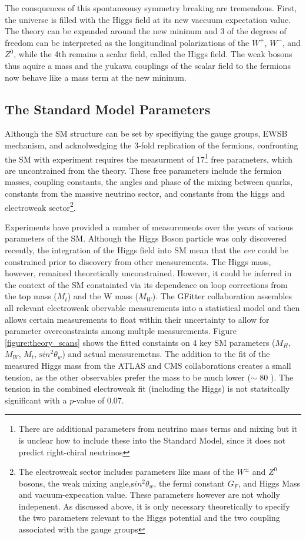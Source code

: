 The consquences of this spontaneousy symmetry breaking are tremendous. First,
the universe is filled with the Higgs field at its new vaccuum expectation
value. The theory can be expanded around the new mininum and 3 of the
degrees of freedom can be interpreted as the longitundinal polarizations of
the $W^+$, $W^-$, and $Z^0$, while the 4th remains a scalar field, called
the Higgs field. The weak bosons thus aquire a mass and the yukawa
couplings of the scalar field to the fermions now behave like a mass term
at the new mininum. 


\subsection{The Standard Model Parameters}

Although the SM structure can be set by specifiying the gauge groups, EWSB
mechanism, and acknolwedging the 3-fold replication of the fermions,
confronting the SM with experiment requires the measurment of
17\footnote{There are additional parameters from neutrino mass terms and
mixing but it is unclear how to include these into the Standard Model,
since it does not predict right-chiral neutrinos} free parameters, which
are uncontrained from the theory. These free parameters include the fermion
masses, coupling constants, the angles and phase of the mixing between
quarks, constants from the massive neutrino sector, and constants from the
higgs and electroweak sector\footnote{ The electroweak sector includes
parameters like mass of the $W^{\pm}$ and $Z^0$ bosons, the weak mixing
angle,${\mathrm sin^2}\theta_w$, the fermi constant $G_F$, and Higgs
Mass and vacuum-expecation value. These parameters however are not
wholly indepenent. As discussed above, it is only necessary
theoretically to specify the two parameters relevant to the Higgs
potential and the two coupling associated with the gauge groups }.

Experiments have provided a number of measurements over the years of various
parameters of the SM. Although the Higgs Boson particle was only discovered recently,
the integration of the Higgs field into SM mean that the $vev$ could
be constrained prior to discovery from other measurements. The Higgs mass,
however, remained theoretically unconstrained. 
However, it could be inferred in the context of the SM
constainted via its dependence on loop corrections from the top mass
($M_t$) and the W mass ($M_W$). The GFitter collaboration assembles
all relevant electroweak obervable measurements into a statistical
model and then allows certain measurements to float within their
uncertainty to allow for parameter overconstraints among multple
measurements. Figure \ref{figure:theory_scans} shows the fitted constaints on 4 key SM
parameters ($M_H$, $M_W$, $M_t$, ${\mathrm sin^2}\theta_w$) and
actual measuremetns. The addition to the fit of the measured
Higgs mass from the ATLAS and CMS collaborations creates a small
tension, as the other observables prefer the mass to be much
lower ($\sim$ 80 \gevcc). The tension in the combined
electroweak fit (including the Higgs) is not statsitcally
significant with a $p$-value of 0.07.  

